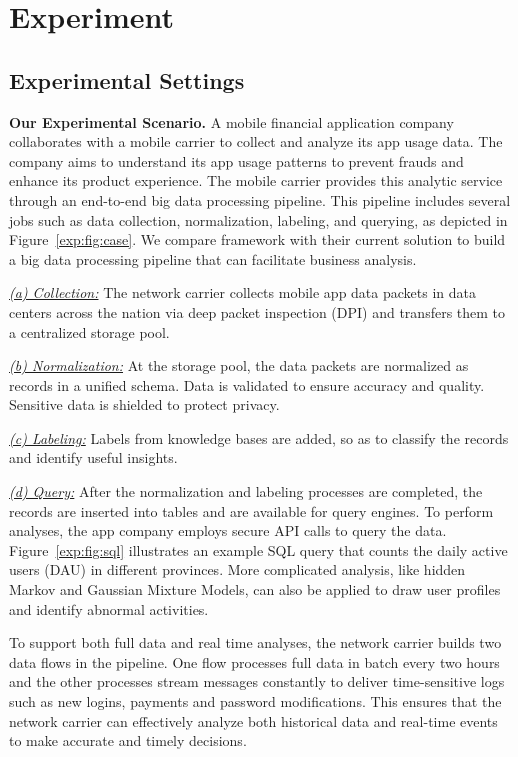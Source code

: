 \section{Experiment} 
\label{sec:exp}

\subsection{Experimental Settings}


\noindent \textbf{Our Experimental Scenario.}     A mobile financial application company collaborates with a mobile carrier to collect and analyze its app usage data. The company aims to understand its app usage patterns to prevent frauds and enhance its product experience. The mobile carrier provides this analytic service through an end-to-end big data processing pipeline. This pipeline includes several jobs such as data collection, normalization, labeling, and querying, as depicted in Figure~\ref{exp:fig:case}.
We compare  \sys framework with their current solution to build a big data processing pipeline that can facilitate business analysis.

\noindent \underline{\textit{(a) Collection:}}  The network carrier collects mobile app data packets in  data centers across the nation via deep packet inspection (DPI) and transfers them to a centralized storage pool.

\noindent \underline{\textit{(b) Normalization:}} At the  storage pool, the data packets are normalized as records in a unified schema. Data is validated to ensure accuracy and quality. Sensitive data is shielded to protect  privacy. 

\noindent \underline{\textit{(c) Labeling:}} Labels from knowledge bases are added, so as to classify the records and identify useful insights.

\noindent \underline{\textit{(d) Query:}} After the normalization and labeling processes are completed, the  records are inserted into tables and are available for query engines. To perform analyses, the app company employs secure API calls to query the data. Figure~\ref{exp:fig:sql} illustrates an example SQL query that counts the daily active users (DAU) in different provinces. More complicated analysis, like hidden Markov and Gaussian Mixture Models, can also be applied to draw user profiles and identify abnormal activities.

To support both full data and real time analyses, the network carrier builds two data flows in the pipeline. One flow processes full data in batch every two hours and the other processes stream messages constantly to deliver time-sensitive logs such as new logins, payments and password modifications. This ensures that the network carrier can effectively analyze both historical data and real-time events to make  accurate and timely decisions.

